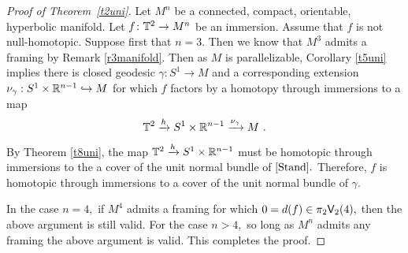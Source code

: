 \begin{proof}[Proof of Theorem~\ref{t2uni}]
Let $M^{n}$ be a connected, compact, orientable, hyperbolic manifold. 
Let $f \colon \mathbb T^{2} \rightarrow M^{n}$ be an immersion. Assume that $f$ is not null-homotopic.
Suppose first that $n = 3.$ Then we know that $M^{3}$ admits a framing by Remark \ref{r3manifold}. Then as $M$ is parallelizable, Corollary \ref{t5uni} implies there is closed geodesic $\gamma: S^{1} \rightarrow M$ and a corresponding extension $\nu_{\gamma}: S^{1} \times \mathbb R^{n - 1} \hookrightarrow M$ for which $f$ factors by a homotopy through immersions to a map 
\[
\mathbb T^{2} \xrightarrow{h} S^{1} \times \mathbb R^{n - 1} \xrightarrow{\nu_{\gamma}} M~.
\]
By Theorem \ref{t8uni}, the map $\mathbb T^{2} \xrightarrow{h} S^{1} \times \mathbb R^{n - 1}$ must be homotopic through immersions to the a cover of the unit normal bundle of $[{\rm Stand}].$ Therefore, $f$ is homotopic through immersions to a cover of the unit normal bundle of $\gamma.$

In the case $n = 4,$ if $M^{4}$ admits a framing for which $0 = d(f) \in \pi_{2}\mathsf V_{2}(4),$ then the above argument is still valid. For the case $n > 4,$ so long as $M^{n}$ admits any framing the above argument is valid. This completes the proof.
\end{proof}
